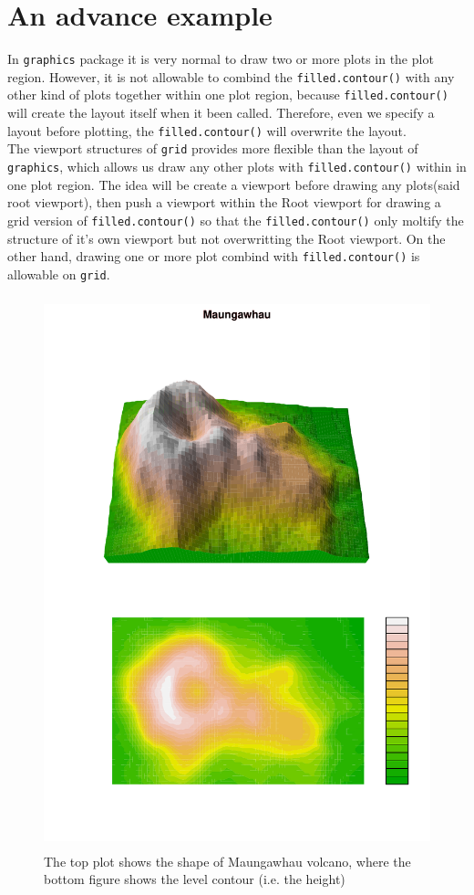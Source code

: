 \documentclass[paper=a4, fontsize=11pt]{report}
\begin{document}
\newpage
\section{An advance example}
In \texttt{graphics} package it is very normal to draw two or more plots in the plot region. However, it is not allowable to combind the \texttt{filled.contour()} with any other kind of plots together within one plot region, because \texttt{filled.contour()} will create the layout itself when it been called. Therefore, even we specify a layout before plotting, the \texttt{filled.contour()} will overwrite the layout.\\

The viewport structures of \texttt{grid} provides more flexible than the layout of \texttt{graphics}, which allows us draw any other plots with \texttt{filled.contour()} within in one plot region. The idea will be create a viewport before drawing any plots(said root viewport), then push a viewport within the Root viewport for drawing a grid version of \texttt{filled.contour()} so that the \texttt{filled.contour()} only moltify the structure of it's own viewport but not overwritting the Root viewport. On the other hand, drawing one or more plot combind with \texttt{filled.contour()} is allowable on \texttt{grid}.\\
\begin{figure}[H]
\begin{center}
  \includegraphics[height = 16cm, width = 12cm]{figure/Chapter6_example_3_1.pdf}
  \caption{The top plot shows the shape of Maungawhau volcano, where the bottom figure shows the level contour (i.e. the height)}
  	\label{Example_6.2.1}
\end{center}
\end{figure}
\end{document}
